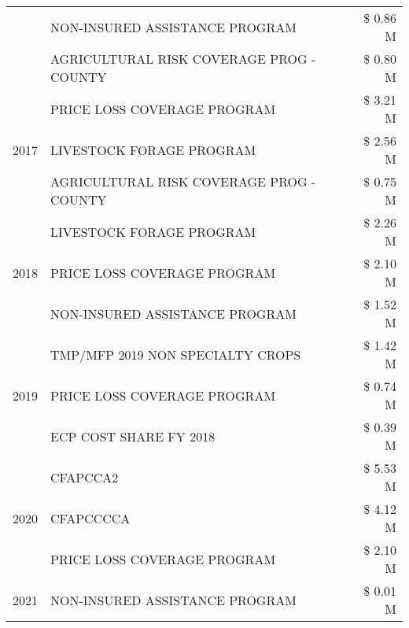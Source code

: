 \begin{tabular}{llr}
 & NON-INSURED ASSISTANCE PROGRAM & \$ 0.86 M \\
 & AGRICULTURAL RISK COVERAGE PROG - COUNTY & \$ 0.80 M \\
\cline{1-3}
\multirow[t]{3}{*}{2017} & PRICE LOSS COVERAGE PROGRAM & \$ 3.21 M \\
 & LIVESTOCK FORAGE PROGRAM & \$ 2.56 M \\
 & AGRICULTURAL RISK COVERAGE PROG - COUNTY & \$ 0.75 M \\
\cline{1-3}
\multirow[t]{3}{*}{2018} & LIVESTOCK FORAGE PROGRAM & \$ 2.26 M \\
 & PRICE LOSS COVERAGE PROGRAM & \$ 2.10 M \\
 & NON-INSURED ASSISTANCE PROGRAM & \$ 1.52 M \\
\cline{1-3}
\multirow[t]{3}{*}{2019} & TMP/MFP 2019 NON SPECIALTY CROPS & \$ 1.42 M \\
 & PRICE LOSS COVERAGE PROGRAM & \$ 0.74 M \\
 & ECP COST SHARE FY 2018 & \$ 0.39 M \\
\cline{1-3}
\multirow[t]{3}{*}{2020} & CFAPCCA2 & \$ 5.53 M \\
 & CFAPCCCCA & \$ 4.12 M \\
 & PRICE LOSS COVERAGE PROGRAM & \$ 2.10 M \\
\cline{1-3}
2021 & NON-INSURED ASSISTANCE PROGRAM & \$ 0.01 M \\
\cline{1-3}
\bottomrule
\end{tabular}

